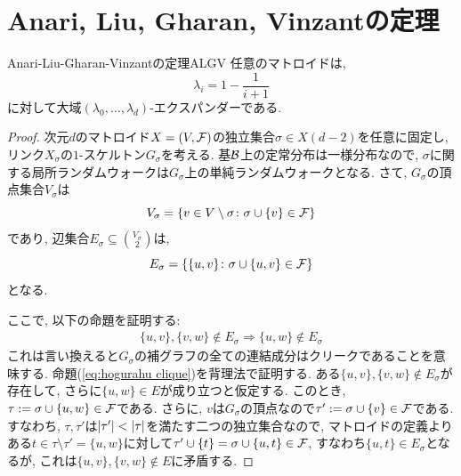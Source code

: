 \section{Anari, Liu, Gharan, Vinzantの定理}
\begin{theorem}{Anari-Liu-Gharan-Vinzantの定理}{ALGV}
    任意のマトロイドは,
    \[ \lambda_i = 1-\frac{1}{i+1}\]
    に対して大域$(\lambda_0,\dots,\lambda_d)$-エクスパンダーである.
\end{theorem}
\begin{proof}
    次元$d$のマトロイド$X=(V,\F)$の独立集合$\sigma \in X(d-2)$を任意に固定し, リンク$X_\sigma$の$1$-スケルトン$G_\sigma$を考える.
    基$\B$上の定常分布は一様分布なので,
    $\sigma$に関する局所ランダムウォークは$G_\sigma$上の単純ランダムウォークとなる.
    さて, $G_\sigma$の頂点集合$V_\sigma$は
    \[V_\sigma = \{v\in V\setminus\sigma\colon \sigma\cup \{v\} \in \F\}\]
    であり,
    辺集合$E_\sigma \subseteq \binom{V_\sigma}{2}$は,
    \[
        E_\sigma = \cbra*{ \{u,v\}\colon \sigma\cup\{u,v\}\in \F }
    \]
    となる.

    ここで, 以下の命題を証明する:
    \begin{align}
        \{u,v\},\{v,w\}\not\in E_\sigma \Rightarrow \{u,w\} \not\in E_\sigma \label{eq:hogurahu clique}        
    \end{align}
    これは言い換えると$G_\sigma$の補グラフの全ての連結成分はクリークであることを意味する.
    命題(\ref{eq:hogurahu clique})を背理法で証明する.
    ある$\{u,v\},\{v,w\}\not\in E_\sigma$が存在して, さらに$\{u,w\}\in E$が成り立つと仮定する.
    このとき, $\tau\defeq \sigma\cup\{u,w\}\in \F$である.
    さらに, $v$は$G_\sigma$の頂点なので$\tau'\defeq \sigma\cup\{v\} \in \F$である.
    すなわち, $\tau,\tau'$は$\abs{\tau'} < \abs{\tau}$を満たす二つの独立集合なので, マトロイドの定義より
    ある$t \in \tau \setminus \tau' = \{u,w\}$に対して$\tau'\cup \{t\}=\sigma\cup\{u,t\} \in \F$, すなわち$\{u,t\}\in E_\sigma$となるが, これは$\{u,v\},\{v,w\}\not\in E$に矛盾する.


\end{proof}

